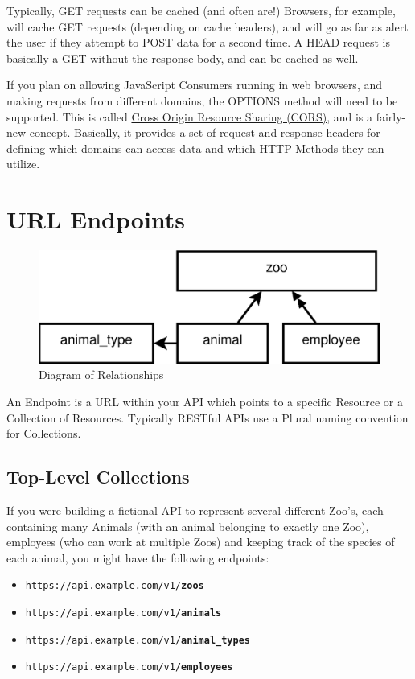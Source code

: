 \documentclass{book}
\begin{document}
Typically, GET requests can be cached (and often are!) Browsers, for example, will cache GET requests (depending on cache headers), and will go as far as alert the user if they attempt to POST data for a second time. A HEAD request is basically a GET without the response body, and can be cached as well.

If you plan on allowing JavaScript Consumers running in web browsers, and making requests from different domains, the OPTIONS method will need to be supported. This is called \href{https://en.wikipedia.org/wiki/Cross-origin_resource_sharing}{Cross Origin Resource Sharing (CORS)}, and is a fairly-new concept. Basically, it provides a set of request and response headers for defining which domains can access data and which HTTP Methods they can utilize.


\section{URL Endpoints}

\begin{figure}[ht!]
\centering
\includegraphics[scale=.5]{images/zoo-relationships.eps}
\caption{Diagram of Relationships}
\label{fig:zoorelationships}
\end{figure}

An Endpoint is a URL within your API which points to a specific Resource or a Collection of Resources. Typically RESTful APIs use a Plural naming convention for Collections.

\subsection{Top-Level Collections}

If you were building a fictional API to represent several different Zoo's, each containing many Animals (with an animal belonging to exactly one Zoo), employees (who can work at multiple Zoos) and keeping track of the species of each animal, you might have the following endpoints:

\begin{itemize}
\item \texttt{https://api.example.com/v1/\textbf{zoos}}
\item \texttt{https://api.example.com/v1/\textbf{animals}}
\item \texttt{https://api.example.com/v1/\textbf{animal\_types}}
\item \texttt{https://api.example.com/v1/\textbf{employees}}
\end{itemize}
\end{document}
